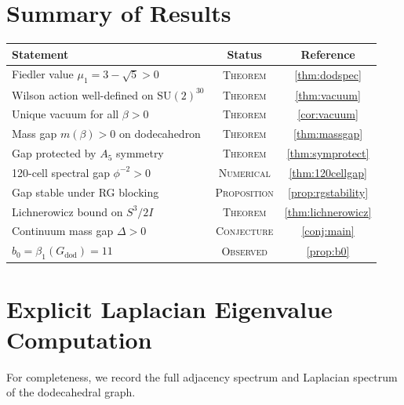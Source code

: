 \documentclass[12pt,a4paper]{article}
\theoremstyle{definition}
\theoremstyle{remark}
\newcommand{\SU}{\mathrm{SU}}
\newcommand{\ph}{\phi}
\begin{document}
\section{Summary of Results}\label{sec:summary}

\renewcommand{\arraystretch}{1.3}
\begin{center}
\begin{tabular}{p{6.5cm}cc}
\toprule
\textbf{Statement} & \textbf{Status} & \textbf{Reference} \\
\midrule
Fiedler value $\mu_1 = 3 - \sqrt{5} > 0$ &
  \textsc{Theorem} & \cref{thm:dodspec} \\
Wilson action well-defined on $\SU(2)^{30}$ &
  \textsc{Theorem} & \cref{thm:vacuum} \\
Unique vacuum for all $\beta > 0$ &
  \textsc{Theorem} & \cref{cor:vacuum} \\
Mass gap $m(\beta) > 0$ on dodecahedron &
  \textsc{Theorem} & \cref{thm:massgap} \\
Gap protected by $A_5$ symmetry &
  \textsc{Theorem} & \cref{thm:symprotect} \\
120-cell spectral gap $\ph^{-2} > 0$ &
  \textsc{Numerical} & \cref{thm:120cellgap} \\
Gap stable under RG blocking &
  \textsc{Proposition} & \cref{prop:rgstability} \\
Lichnerowicz bound on $S^3/2I$ &
  \textsc{Theorem} & \cref{thm:lichnerowicz} \\
Continuum mass gap $\Delta > 0$ &
  \textsc{Conjecture} & \cref{conj:main} \\
$b_0 = \beta_1(G_{\mathrm{dod}}) = 11$ &
  \textsc{Observed} & \cref{prop:b0} \\
\bottomrule
\end{tabular}
\end{center}

\appendix

\section{Explicit Laplacian Eigenvalue Computation}\label{app:eigenvalues}

For completeness, we record the full adjacency spectrum and Laplacian
spectrum of the dodecahedral graph.
\end{document}
